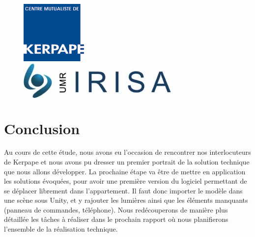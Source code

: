 \documentclass[a4paper,11pt]{article}
\begin{document}
\begin{figure}
\begin{minipage}{0.3\linewidth}
      \includegraphics[width=\textwidth]{1-PreEtude/img/logo_kerpape.png}
   \end{minipage}
   \begin{minipage}{0.3\linewidth}
      \includegraphics[width=\textwidth]{1-PreEtude/img/logo_irisa.jpg}
   \end{minipage}
\end{figure}

\pagebreak

\tableofcontents
\pagebreak


\pagebreak

\pagebreak

\pagebreak

\pagebreak

\pagebreak

\pagebreak

\section{Conclusion}
Au cours de cette étude, nous avons eu l'occasion de rencontrer nos interlocuteurs de Kerpape et nous avons pu dresser un premier portrait de la solution technique que nous allons développer.
La prochaine étape va être de mettre en application les solutions évoquées, pour avoir une première version du logiciel permettant de se déplacer librement dans l'appartement. 
Il faut donc importer le modèle dans une scène sous Unity, et y rajouter les lumières ainsi que les éléments manquants (panneau de commandes, téléphone).
Nous redécouperons de manière plus détaillée les tâches à réaliser dans le prochain rapport où nous planifierons l'ensemble de la réalisation technique.

\pagebreak


\end{document}
